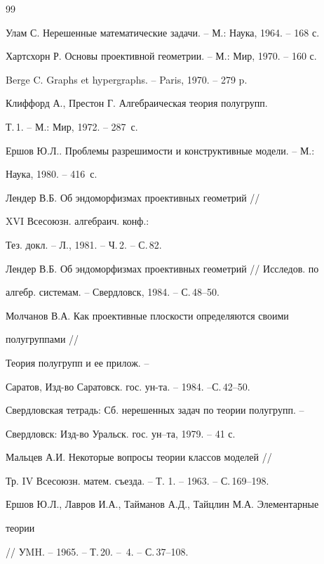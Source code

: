 \begin{thebibliography}{99} 


 




Улам С. Нерешенные математические задачи. -- М.: Наука, 1964. -- 168 с. 




Хартсхорн Р. Основы проективной геометрии. -- М.: Мир, 1970. -- 160 с. 




Berge C. Graphs et hypergraphs. -- Paris, 1970. -- 279 p. 




Клиффорд А., Престон Г. Алгебраическая теория полугрупп. 


Т.\,1. -- М.: Мир, 1972. -- 287~с. 




Ершов Ю.Л.. Проблемы разрешимости и конструктивные модели. -- М.: 


Наука, 1980. -- 416~с. 




Лендер В.Б. Об эндоморфизмах проективных геометрий // 


XVI Всесоюзн. алгебраич. конф.: 


Тез. докл. -- Л., 1981. -- Ч.\,2. -- С.\,82. 




Лендер В.Б. Об эндоморфизмах проективных геометрий // Исследов. по 


алгебр. системам. -- Свердловск, 1984. -- С.\,48--50. 




Молчанов В.А. Как проективные плоскости определяются своими 


полугруппами // 


Теория полугрупп и ее прилож. -- 


Саратов, Изд-во Саратовск. гос. ун-та. -- 1984. --С.\,42--50. 




Свердловская тетрадь: Сб. нерешенных задач по теории полугрупп. -- 


Свердловск: Изд-во Уральск. гос. ун--та, 1979. -- 41 с. 




Мальцев А.И. Некоторые вопросы теории классов моделей // 


Тр. IV Всесоюзн. матем. съезда. -- Т. 1. -- 1963. -- С.\,169--198. 




Ершов Ю.Л., Лавров И.А., Тайманов А.Д., Тайцлин М.А. Элементарные 


теории 


// УMH. -- 1965. -- Т.\,20. -- \No\,4. -- С.\,37--108. 


 


\end{thebibliography} 


